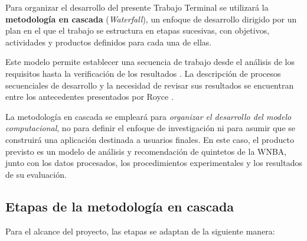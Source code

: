Para organizar el desarrollo del presente Trabajo Terminal se utilizará la \textbf{metodología en cascada} (\textit{Waterfall}), un enfoque de desarrollo dirigido por un plan en el que el trabajo se estructura en etapas sucesivas, con objetivos, actividades y productos definidos para cada una de ellas. 

Este modelo permite establecer una secuencia de trabajo desde el análisis de los requisitos hasta la verificación de los resultados \cite{sommerville2016software,ibmWaterfallModel,ibmWaterfallAdvantages}. La descripción de procesos secuenciales de desarrollo y la necesidad de revisar sus resultados se encuentran entre los antecedentes presentados por Royce \cite{royce1970large}.

La metodología en cascada se empleará para \emph{organizar el desarrollo del modelo computacional}, no para definir el enfoque de investigación ni para asumir que se construirá una aplicación destinada a usuarios finales. En este caso, el producto previsto es un modelo de análisis y recomendación de quintetos de la WNBA, junto con los datos procesados, los procedimientos experimentales y los resultados de su evaluación.

\subsection{Etapas de la metodología en cascada}

Para el alcance del proyecto, las etapas se adaptan de la siguiente manera:

